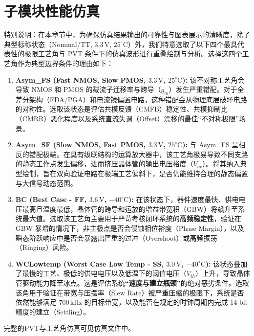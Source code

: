\chapter{子模块性能仿真}

特别说明：在本章节中，为确保仿真结果输出的可靠性与图表展示的清晰度，除了典型标称状态（Nominal/TT, $3.3\,\mathrm{V}$, $25^\circ\mathrm{C}$）外，我们特意选取了以下四个最具代表性的极限工艺角与 PVT 条件下的仿真波形进行重叠绘制与分析。选择这四个工艺角作为典型边界条件的理由如下：

\begin{enumerate}
    \item \textbf{Asym\_FS (Fast NMOS, Slow PMOS, $3.3\,\mathrm{V}$, $25^\circ\mathrm{C}$):} 
    该不对称工艺角会导致 NMOS 和 PMOS 的载流子迁移率与跨导（$g_m$）发生严重错配。对于全差分架构（FDA/PGA）和电流镜偏置电路，这种错配会从物理底层破坏电路的对称性。选取该状态是评估共模反馈（CMFB）稳定性、共模抑制比（CMRR）恶化程度以及系统直流失调（Offset）漂移的最佳“不对称极限”场景。

    \item \textbf{Asym\_SF (Slow NMOS, Fast PMOS, $3.3\,\mathrm{V}$, $25^\circ\mathrm{C}$):} 
    与 Asym\_FS 呈相反的错配极端。在具有级联结构的运算放大器中，该工艺角极易导致不同支路的静态工作点发生偏移，进而挤压晶体管的输出电压裕度（$V_{ov}$）。将其纳入典型绘制，旨在双向验证电路在极端工艺偏斜下，是否仍能维持合理的静态偏置与大信号动态范围。

    \item \textbf{BC (Best Case - FF, $3.6\,\mathrm{V}$, $-40^\circ\mathrm{C}$):} 
    在该状态下，器件速度最快、供电电压最高且温度最低，晶体管的跨导和运放的增益带宽积（GBW）将飙升至系统最大值。选取该工艺角主要用于严苛考核闭环系统的\textbf{高频稳定性}，验证在 GBW 暴增的情况下，非主极点是否会侵蚀相位裕度（Phase Margin），以及瞬态阶跃响应中是否会暴露出严重的过冲（Overshoot）或高频振荡（Ringing）风险。

    \item \textbf{WCLowtemp (Worst Case Low Temp - SS, $3.0\,\mathrm{V}$, $-40^\circ\mathrm{C}$):} 
    该状态叠加了最慢的工艺、极低的供电电压以及低温下的阈值电压（$V_{th}$）上升，导致晶体管驱动能力降至冰点。这是评估系统\textbf{“速度与建立瓶颈”}的绝对恶劣条件。选取该角用于验证在带宽与压摆率（Slew Rate）被严重压缩的极限下，系统是否依然能够满足 $700\,\mathrm{kHz}$ 的目标带宽，以及能否在规定的时钟周期内完成 14-bit 精度的建立（Settling）。
\end{enumerate}
完整的PVT与工艺角仿真可见仿真文件中。

